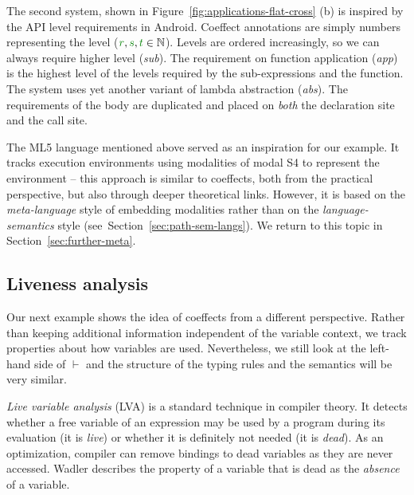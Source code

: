 The second system, shown in Figure~\ref{fig:applications-flat-cross} (b) is inspired by the API
level requirements in Android. Coeffect annotations are simply numbers representing the level
($\cclrd{r}, \cclrd{s}, \cclrd{t} \in \mathbb{N}$). Levels are ordered increasingly, so we can
always require higher level (\emph{sub}). The requirement on function application (\emph{app}) is
the highest level of the levels required by the sub-expressions and the function. The system uses
yet another variant of lambda abstraction (\emph{abs}). The requirements of the body are duplicated
and placed on \emph{both} the declaration site and the call site.

The ML5 language \cite{app-distributed-ml5} mentioned above served as an inspiration for our example.
It tracks execution environments using modalities of modal S4 to represent the environment -- this
approach is similar to coeffects, both from the practical perspective, but also through deeper
theoretical links. However, it is based on the \emph{meta-language} style of embedding modalities
rather than on the \emph{language-semantics} style (see~Section~\ref{sec:path-sem-langs}). We
return to this topic in Section~\ref{sec:further-meta}.


\subsection{Liveness analysis}
\label{sec:applications-flat-live}
Our next example shows the idea of coeffects from a different perspective. Rather than
keeping additional information independent of the variable context, we track properties about how
variables are used. Nevertheless, we still look at the left-hand side of $\vdash$ and the structure
of the typing rules and the semantics will be very similar.

\emph{Live variable analysis} (LVA) \cite{app-modern-compiler} is a standard technique in compiler
theory. It detects whether a free variable of an expression may be used by a program during its
evaluation (it is \emph{live}) or whether it is definitely not needed (it is \emph{dead}). As an
optimization, compiler can remove bindings to dead variables as they are never accessed. Wadler
\cite{app-strictness-absecnce} describes the property of a variable that is dead as the
\emph{absence} of a variable.

